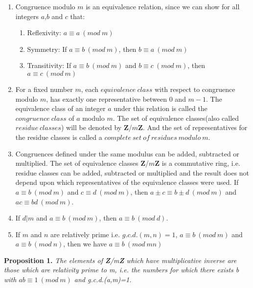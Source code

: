 \documentclass[12pt]{article}
\begin{document}
\begin{enumerate}

\item Congruence modulo $m$ is an equivalence relation, since we can show for all integers $a$,$b$ and $c$ that:
\begin{enumerate}
\item Reflexivity: $a \equiv a \: (mod \: m)$
\item Symmetry: If $a \equiv b \: (mod \: m)$, then $b \equiv a \: (mod \: m)$
\item Transitivity: If $a \equiv b \: (mod \: m)$ and $b \equiv c \: (mod \: m)$, then $a \equiv c \: (mod \: m)$
\end{enumerate}

\item For a fixed number $m$, each $equivalence \: class$ with respect to congruence modulo $m$, has exactly one representative between $0$ and $m-1$. The equivalence class of an integer $a$ under this relation is called the $congruence \: class$ of $a$ modulo $m$. The set of equivalence classes(also called $residue \: classes$) will be denoted by \textbf{Z}/$m$\textbf{Z}. And the set of representatives for the residue classes is called a $complete \: set \: of \: residues \: modulo \: m$.

\item Congruences defined under the same modulus can be added, subtracted or multiplied. The set of equivalence classes \textbf{Z}/$m$\textbf{Z} is a commutative ring, i.e. residue classes can be added, subtracted or multiplied and the result does not depend upon which representatives of the equivalence classes were used. If $a \equiv b \: (mod \: m)$ and $c \equiv d \: (mod \: m)$, then $a \pm c \equiv b \pm d \: (mod \: m)$ and $ac \equiv bd \: (mod \: m)$.

\item If $d|m$ and $a \equiv b \: (mod \: m)$, then $a \equiv b \: (mod \: d)$.

\item If $m$ and $n$ are relatively prime i.e. $g.c.d.(m,n)=1$, $a \equiv b \: (mod \: m)$ and $a \equiv b \: (mod \: n)$, then we have $a \equiv b \: (mod \: mn)$
\end{enumerate} \par

\textbf{Proposition 1.} \textit{The elements of \textbf{Z}/m\textbf{Z} which have multiplicative inverse are those which are relativity prime to m, i.e. the numbers for which there exists b with $ ab \equiv 1 \: ( mod\:  m)$ and g.c.d.(a,m)=1.}
\end{document}
